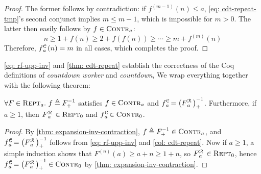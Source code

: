\begin{proof}
	The former follows by contradiction: if $f^{(m-1)}(n) \le a$, \eqref{eq: cdt-repeat-tmp}'s second conjunct implies $m\le m-1$, which is impossible for $m > 0$. The latter then easily follows by $f\in \text{\scshape{Contr}}_{a}$:
	\begin{equation*}
	n \ge 1 + f(n) \ge 2 + f(f(n)) \ge \cdots \ge m + f^{(m)}(n)
	\end{equation*}
	Therefore, $\cdt{f}{a}(n) = m$ in all cases, which completes the proof.
\end{proof}
\cref{eq: rf-upp-inv} and \cref{thm: cdt-repeat} establish the correctness of the Coq definitions of \emph{countdown worker} and \emph{countdown},  We wrap everything together with the following theorem:
\begin{thm} \label{thm: cdt-inv-rf}
	$\forall F\in \text{\scshape{Rept}}_a.~f\triangleq F^{-1}_+$ satisfies $f \in \text{\scshape{Contr}}_{a}$ and $\displaystyle \cdt{f}{a} \ = \left(\rf{F}{a}\ \right)^{-1}_+$. Furthermore, if $a\ge 1$, then $\rf{F}{a}\ \in \repeatable_0$ and $\cdt{f}{a}\ \in \contract_0$.
\end{thm}
\begin{proof}
	By \cref{thm: expansion-inv-contraction}, $f\triangleq F^{-1}_+ \in \text{\scshape{Contr}}_a$, and $\cdt{f}{a}\ = \left(\rf{F}{a}\ \right)^{-1}_+$ follows from \eqref{eq: rf-upp-inv} and \cref{col: cdt-repeat}.
	Now if $a\ge 1$, a simple induction shows that $F^{(n)}(a)\ge a + n\ge 1 + n$, so $\rf{F}{a}\ \in \repeatable_0$, hence $\cdt{f}{a} \ = \left(\rf{F}{a}\ \right)^{-1}_+ \in \contract_0$ by \cref{thm: expansion-inv-contraction}.
\end{proof}

